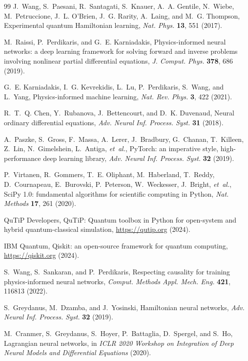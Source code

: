 \documentclass[twocolumn,aps,prxquantum,superscriptaddress,nofootinbib,floatfix,longbibliography]{revtex4-2}
\begin{document}
\begin{thebibliography}{99}
J.~Wang, S.~Paesani, R.~Santagati, S.~Knauer, A.~A. Gentile, N.~Wiebe, M.~Petruccione, J.~L. O'Brien, J.~G. Rarity, A.~Laing, and M.~G. Thompson, Experimental quantum Hamiltonian learning, \emph{Nat. Phys.} \textbf{13}, 551 (2017).

M.~Raissi, P.~Perdikaris, and G.~E. Karniadakis, Physics-informed neural networks: a deep learning framework for solving forward and inverse problems involving nonlinear partial differential equations, \emph{J. Comput. Phys.} \textbf{378}, 686 (2019).

G.~E. Karniadakis, I.~G. Kevrekidis, L.~Lu, P.~Perdikaris, S.~Wang, and L.~Yang, Physics-informed machine learning, \emph{Nat. Rev. Phys.} \textbf{3}, 422 (2021).

R.~T.~Q. Chen, Y.~Rubanova, J.~Bettencourt, and D.~K. Duvenaud, Neural ordinary differential equations, \emph{Adv. Neural Inf. Process. Syst.} \textbf{31} (2018).

A.~Paszke, S.~Gross, F.~Massa, A.~Lerer, J.~Bradbury, G.~Chanan, T.~Killeen, Z.~Lin, N.~Gimelshein, L.~Antiga, \emph{et~al.}, PyTorch: an imperative style, high-performance deep learning library, \emph{Adv. Neural Inf. Process. Syst.} \textbf{32} (2019).

P.~Virtanen, R.~Gommers, T.~E. Oliphant, M.~Haberland, T.~Reddy, D.~Cournapeau, E.~Burovski, P.~Peterson, W.~Weckesser, J.~Bright, \emph{et~al.}, SciPy 1.0: fundamental algorithms for scientific computing in Python, \emph{Nat. Methods} \textbf{17}, 261 (2020).

QuTiP Developers, QuTiP: Quantum toolbox in Python for open-system and hybrid quantum-classical simulation, \url{https://qutip.org} (2024).

IBM Quantum, Qiskit: an open-source framework for quantum computing, \url{https://qiskit.org} (2024).

S.~Wang, S.~Sankaran, and P.~Perdikaris, Respecting causality for training physics-informed neural networks, \emph{Comput. Methods Appl. Mech. Eng.} \textbf{421}, 116813 (2022).

S.~Greydanus, M.~Dzamba, and J.~Yosinski, Hamiltonian neural networks, \emph{Adv. Neural Inf. Process. Syst.} \textbf{32} (2019).

M.~Cranmer, S.~Greydanus, S.~Hoyer, P.~Battaglia, D.~Spergel, and S.~Ho, Lagrangian neural networks, in \emph{ICLR 2020 Workshop on Integration of Deep Neural Models and Differential Equations} (2020).


\end{thebibliography}
\end{document}
